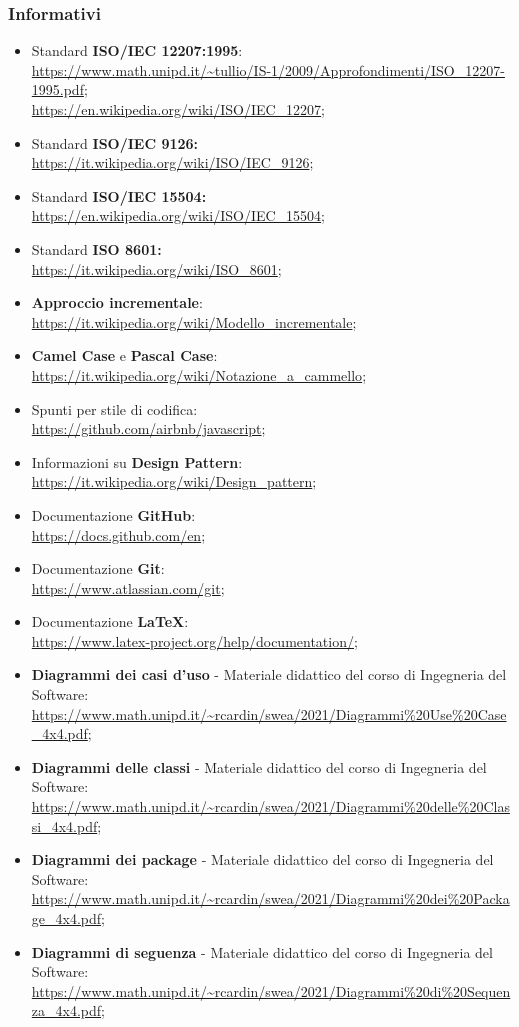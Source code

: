 \subsubsection{Informativi}
\begin{itemize}
\item Standard \textbf{ISO/IEC 12207:1995}:\\ \url{https://www.math.unipd.it/~tullio/IS-1/2009/Approfondimenti/ISO_12207-1995.pdf};\\
\url{https://en.wikipedia.org/wiki/ISO/IEC_12207};
\item Standard \textbf{ISO/IEC 9126: }\\ \url{https://it.wikipedia.org/wiki/ISO/IEC_9126};
\item Standard \textbf{ISO/IEC 15504: }\\ \url{https://en.wikipedia.org/wiki/ISO/IEC_15504};
\item Standard \textbf{ISO 8601: }\\ \url{https://it.wikipedia.org/wiki/ISO_8601};
\item \textbf{Approccio incrementale}:\\ \url{https://it.wikipedia.org/wiki/Modello_incrementale};
\item \textbf{Camel Case} e \textbf{Pascal Case}:\\ \url{https://it.wikipedia.org/wiki/Notazione_a_cammello};
\item Spunti per stile di codifica:\\ \url{https://github.com/airbnb/javascript};
\item Informazioni su \textbf{Design Pattern}:\\ \url{https://it.wikipedia.org/wiki/Design_pattern};
\item Documentazione \textbf{GitHub}:\\ \url{https://docs.github.com/en};
\item Documentazione \textbf{Git}:\\ \url{https://www.atlassian.com/git};
\item Documentazione \textbf{\LaTeX}:\\ \url{https://www.latex-project.org/help/documentation/};
\item \textbf{Diagrammi dei casi d'uso} - Materiale didattico del corso di Ingegneria del Software:\\ \url{https://www.math.unipd.it/~rcardin/swea/2021/Diagrammi%20Use%20Case_4x4.pdf};
\item \textbf{Diagrammi delle classi} - Materiale didattico del corso di Ingegneria del Software:\\ \url{https://www.math.unipd.it/~rcardin/swea/2021/Diagrammi%20delle%20Classi_4x4.pdf};
\item \textbf{Diagrammi dei package} - Materiale didattico del corso di Ingegneria del Software:\\ \url{https://www.math.unipd.it/~rcardin/swea/2021/Diagrammi%20dei%20Package_4x4.pdf};
\item \textbf{Diagrammi di seguenza} - Materiale didattico del corso di Ingegneria del Software:\\ \url{https://www.math.unipd.it/~rcardin/swea/2021/Diagrammi%20di%20Sequenza_4x4.pdf};
\end{itemize}
